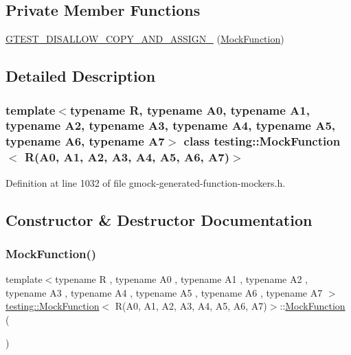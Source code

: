\subsection*{Private Member Functions}
\begin{DoxyCompactItemize}
\item 
\hyperlink{classtesting_1_1MockFunction_3_01R_07A0_00_01A1_00_01A2_00_01A3_00_01A4_00_01A5_00_01A6_00_01A7_08_4_a445a7908911449f9317225121af6a476}{G\+T\+E\+S\+T\+\_\+\+D\+I\+S\+A\+L\+L\+O\+W\+\_\+\+C\+O\+P\+Y\+\_\+\+A\+N\+D\+\_\+\+A\+S\+S\+I\+G\+N\+\_\+} (\hyperlink{classtesting_1_1MockFunction}{Mock\+Function})
\end{DoxyCompactItemize}


\subsection{Detailed Description}
\subsubsection*{template$<$typename R, typename A0, typename A1, typename A2, typename A3, typename A4, typename A5, typename A6, typename A7$>$\newline
class testing\+::\+Mock\+Function$<$ R(\+A0, A1, A2, A3, A4, A5, A6, A7)$>$}



Definition at line 1032 of file gmock-\/generated-\/function-\/mockers.\+h.



\subsection{Constructor \& Destructor Documentation}
\mbox{\label{classtesting_1_1MockFunction_3_01R_07A0_00_01A1_00_01A2_00_01A3_00_01A4_00_01A5_00_01A6_00_01A7_08_4_ab2ac033046600396f088321ef0508e63}} 
\subsubsection{\texorpdfstring{Mock\+Function()}{MockFunction()}}
{\footnotesize\ttfamily template$<$typename R , typename A0 , typename A1 , typename A2 , typename A3 , typename A4 , typename A5 , typename A6 , typename A7 $>$ \\
\hyperlink{classtesting_1_1MockFunction}{testing\+::\+Mock\+Function}$<$ R(A0, A1, A2, A3, A4, A5, A6, A7)$>$\+::\hyperlink{classtesting_1_1MockFunction}{Mock\+Function} (\begin{DoxyParamCaption}{ }\end{DoxyParamCaption})\hspace{0.3cm}{\ttfamily [inline]}}



